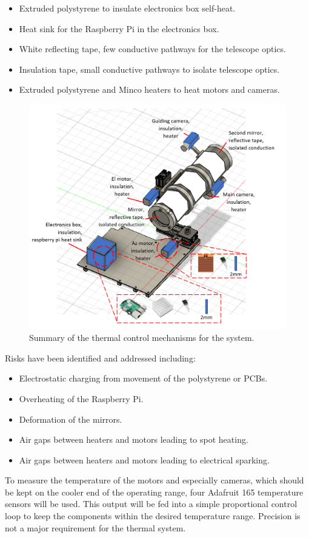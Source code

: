 \begin{itemize}
  \item Extruded polystyrene to insulate electronics box self-heat. 
  \item Heat sink for the Raspberry Pi in the electronics box.
  \item White reflecting tape, few conductive pathways for the telescope optics.
  \item Insulation tape, small conductive pathways to isolate telescope optics.
  \item Extruded polystyrene and Minco heaters to heat motors and cameras.

\end{itemize}

\begin{figure}[h!]
\centering
\includegraphics[scale=0.8]{4-experiment-design/img/mechanical/thermalsolutions.png}
\caption{Summary of the thermal control mechanisms for the system.}
\label{fig:thermalsolutions}
\end{figure}

Risks have been identified and addressed including:

\begin{itemize}
  \item Electrostatic charging from movement of the polystyrene or PCBs.
  \item Overheating of the Raspberry Pi. 
  \item Deformation of the mirrors. 
  \item Air gaps between heaters and motors leading to spot heating. 
  \item Air gaps between heaters and motors leading to electrical sparking.

\end{itemize}

To measure the temperature of the motors and especially cameras, which should be kept on the cooler end of the operating range, four Adafruit 165 temperature sensors will be used. This output will be fed into a simple proportional control loop to keep the components within the desired temperature range. Precision is not a major requirement for the thermal system. 

